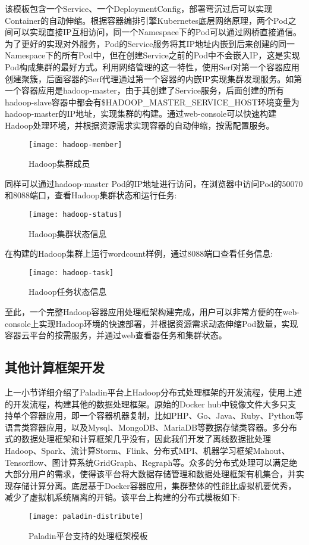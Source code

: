 该模板包含一个Service、一个DeploymentConfig，部署弯沉过后可以实现Container的自动伸缩。根据容器编排引擎Kubernetes底层网络原理，两个Pod之间可以实现直接IP互相访问，同一个Namespace下的Pod可以通过网桥直接通信。为了更好的实现对外服务，Pod的Service服务将其IP地址内嵌到后来创建的同一Namespace下的所有Pod中，但在创建Service之前的Pod中不会嵌入IP，这是实现Pod构成集群的最好方式。利用网络管理的这一特性，使用Serf对第一个容器应用创建聚簇，后面容器的Serf代理通过第一个容器的内嵌IP实现集群发现服务。如第一个容器应用是hadoop-master，由于其创建了Service服务，后面创建的所有hadoop-slave容器中都会有\$HADOOP\_MASTER\_SERVICE\_HOST环境变量为hadoop-master的IP地址，实现集群的构建。通过web-console可以快速构建Hadoop处理环境，并根据资源需求实现容器的自动伸缩，按需配置服务。
\begin{figure}[H] %
	\centering
	\texttt{[image: hadoop-member]}
	\caption{Hadoop集群成员}
\end{figure}

同样可以通过hadoop-master Pod的IP地址进行访问，在浏览器中访问Pod的50070和8088端口，查看Hadoop集群状态和运行任务:
\begin{figure}[H] %
	\centering
	\texttt{[image: hadoop-status]}
	\caption{Hadoop集群状态信息}
\end{figure}
在构建的Hadoop集群上运行wordcount样例，通过8088端口查看任务信息:
\begin{figure}[H] %
	\centering
	\texttt{[image: hadoop-task]}
	\caption{Hadoop任务状态信息}
\end{figure}

至此，一个完整Hadoop容器应用处理框架构建完成，用户可以非常方便的在web-console上实现Hadoop环境的快速部署，并根据资源需求动态伸缩Pod数量，实现容器云平台的按需服务，并通过web查看器任务和集群状态。

\subsection{其他计算框架开发}
上一小节详细介绍了Paladin平台上Hadoop分布式处理框架的开发流程，使用上述的开发流程，构建其他的数据处理框架。原始的Docker hub中镜像文件大多只支持单个容器应用，即一个容器机器复制，比如PHP、Go、Java、Ruby、Python等语言类容器应用，以及Mysql、MongoDB、MariaDB等数据存储类容器。多分布式的数据处理框架和计算框架几乎没有，因此我们开发了离线数据批处理Hadoop、Spark、流计算Storm、Flink、分布式MPI、机器学习框架Mahout、Tensorflow、图计算系统GridGraph、Regraph等。众多的分布式处理可以满足绝大部分用户的需求，使得该平台将大数据存储管理和数据处理框架有机集合，并实现存储计算分离。底层基于Docker容器应用，集群整体的性能比虚拟机要优秀，减少了虚拟机系统隔离的开销。该平台上构建的分布式模板如下:
\begin{figure}[H] %
	\centering
	\texttt{[image: paladin-distribute]}
	\caption{Paladin平台支持的处理框架模板}
\end{figure}


